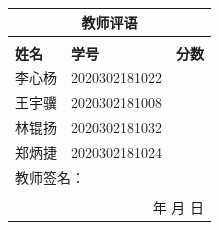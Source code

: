 \documentclass[UTF8,12pt]{ctexart}
\begin{document}
    
    \begin{table}[H]
    \centering
    \begin{tabular}{|p{4cm}<{\centering}|p{6cm}<{\centering}|p{3cm}<{\centering}|}
    \hline
    \multicolumn{3}{|c|}{\textbf{教师评语}}                                                  \\ \hline
    \multicolumn{3}{|c|}{ \rule{0pt}{60pt} }                                                      \\ \hline
    {\textbf{姓名}} & {\textbf{学号}}   & \textbf{分数} \\ \hline
    \multicolumn{1}{|c|}{李心杨} & \multicolumn{1}{c|}{2020302181022}  &             \\ \hline
    \multicolumn{1}{|c|}{王宇骥} & \multicolumn{1}{c|}{2020302181008} &             \\ \hline
    \multicolumn{1}{|c|}{林锟扬} & \multicolumn{1}{c|}{2020302181032} &             \\ \hline
    \multicolumn{1}{|c|}{郑炳捷} & \multicolumn{1}{c|}{2020302181024} &             \\ \hline
    \multicolumn{3}{|l|}{教师签名：}       \\ 
    \multicolumn{3}{|r|}{} \\ 
    \multicolumn{3}{|r|}{年 \space 月 \space 日} \\ \hline
    \end{tabular}
    \end{table}
    
\end{document}
